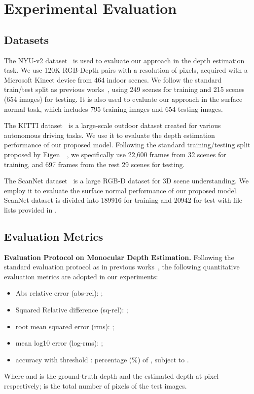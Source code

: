 \section{Experimental Evaluation}
\subsection{Datasets}
The {NYU-v2} dataset~\cite{silberman2012indoor} is used to evaluate our approach in the depth estimation task. We use 120K RGB-Depth pairs with a resolution of  pixels, acquired with a Microsoft Kinect device from 464 indoor scenes. We follow the standard train/test split as previous works~\cite{eigen2014depth}, using 249 scenes for training and 215 scenes (654 images) for testing. It is also used to evaluate our approach in the surface normal task, which includes 795 training images and 654 testing images.

The {KITTI} dataset~\cite{Geiger2013IJRR} is a large-scale outdoor dataset created for various autonomous driving tasks. We use it to evaluate the depth estimation performance of our proposed model. Following the standard training/testing split proposed by Eigen~\etal~\cite{eigen2014depth}, we specifically use 22,600 frames from 32 scenes for training, and 697 frames from the rest 29 scenes for testing.

The {ScanNet} dataset~\cite{dai2017scannet} is a large RGB-D dataset for 3D scene understanding. We employ it to evaluate the surface normal performance of our proposed model. ScanNet dataset is divided into 189916 for training and 20942 for test with file lists provided in \cite{dai2017scannet}.

\subsection{Evaluation Metrics}
\par\noindent\textbf{Evaluation Protocol on Monocular Depth Estimation.}
Following the standard evaluation protocol as in previous works~\cite{eigen2015predicting,eigen2014depth,wang2015towards}, the following quantitative evaluation metrics are adopted in our experiments: 
\begin{itemize}
\item Abs relative error (abs-rel): 
; 
\item Squared Relative difference (sq-rel):
; 
\item root mean squared error (rms): 
;
\item mean log10 error (log-rms): 
;
\item accuracy with threshold : percentage (\%) of , subject to .
\end{itemize}
Where  and  is the ground-truth depth and the estimated depth at pixel  respectively;  is the total number of pixels of the test images.

